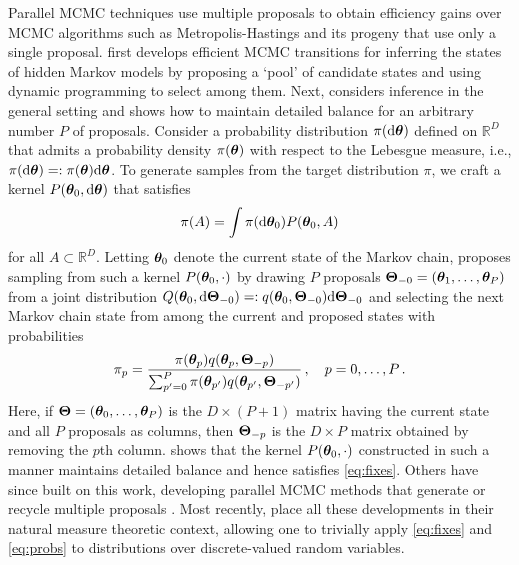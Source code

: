 \documentclass[12pt]{article} %
\begin{document}
Parallel MCMC techniques use multiple proposals to obtain efficiency gains over MCMC algorithms such as Metropolis-Hastings \citep{metropolis1953equation,hastings1970monte} and its progeny that use only a single proposal.  \citet{neal2003markov} first develops efficient MCMC transitions for inferring the states of hidden Markov models by proposing a `pool' of candidate states and using dynamic programming to select among them. Next, \citet{tjelmeland2004using} considers inference in the general setting and shows how to maintain detailed balance for an arbitrary number $P$ of proposals.  Consider a probability distribution $\pi(\mbox{d}\boldsymbol{\theta})$ defined on $\mathbb{R}^D$ that admits a probability density $\pi(\boldsymbol{\theta})$ with respect to the Lebesgue measure, i.e., $\pi(\mbox{d} \boldsymbol{\theta})=:\pi(\boldsymbol{\theta})\mbox{d}\boldsymbol{\theta}$. To generate samples from the target distribution $\pi$, we craft a kernel $P(\boldsymbol{\theta}_0,\mbox{d} \boldsymbol{\theta})$ that satisfies
\begin{align}\label{eq:fixes}
\pi(A) = \int \pi(\mbox{d} \boldsymbol{\theta}_0) P(\boldsymbol{\theta}_0,A) 
\end{align} 
for all $A \subset \mathbb{R}^D$.  Letting $\boldsymbol{\theta}_0$ denote the current state of the Markov chain, \citet{tjelmeland2004using} proposes sampling from such a kernel $P(\boldsymbol{\theta}_0,\cdot)$ by drawing $P$ proposals $\boldsymbol{\Theta}_{-0}=(\boldsymbol{\theta}_1,\dots,\boldsymbol{\theta}_P)$ from a joint distribution $Q(\boldsymbol{\theta}_0,\mbox{d} \boldsymbol{\Theta}_{-0}) =: q(\boldsymbol{\theta}_0, \boldsymbol{\Theta}_{-0})\mbox{d}  \boldsymbol{\Theta}_{-0}$ and selecting the next Markov chain state from among the current and proposed states with probabilities
\begin{align}\label{eq:probs}
\pi_p = \frac{\pi(\boldsymbol{\theta}_p) q(\boldsymbol{\theta}_p, \boldsymbol{\Theta}_{-p})}{\sum_{p'=0}^P \pi(\boldsymbol{\theta}_{p'})q(\boldsymbol{\theta}_{p'}, \boldsymbol{\Theta}_{-p'})} \, , \quad p=0,\dots,P \, .
\end{align}
Here, if $\boldsymbol{\Theta}=(\boldsymbol{\theta}_0,\dots,\boldsymbol{\theta}_{P})$ is the $D\times (P+1)$ matrix having the current state and all $P$ proposals as columns, then $\boldsymbol{\Theta}_{-p}$ is the $D\times P$ matrix obtained by removing the $p$th column.
\citet{tjelmeland2004using} shows that the kernel $P(\boldsymbol{\theta}_0,\cdot)$ constructed in such a manner maintains detailed balance and hence satisfies \eqref{eq:fixes}.  Others have since built on this work, developing parallel MCMC methods that generate or recycle multiple proposals \citep{frenkel2004speed,delmas2009does,calderhead2014general,yang2018parallelizable,luo2019multiple,schwedes2021rao,holbrook2021generating}.  Most recently, \citet{glatt} place all these developments in their natural measure theoretic context, allowing one to trivially apply \eqref{eq:fixes} and \eqref{eq:probs} to distributions over discrete-valued random variables.
\end{document}
